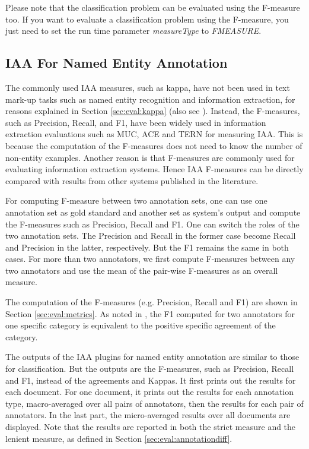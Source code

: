 Please note that the classification problem can be evaluated using the F-measure
too. If you want to evaluate a classification problem using the F-measure, you
just need to set the run time parameter {\em measureType} to {\em FMEASURE}.

\subsection{IAA For Named Entity Annotation}

The commonly used IAA measures, such as kappa, have not been used in text mark-up
tasks such as named entity recognition and information extraction, for reasons
explained in Section \ref{sec:eval:kappa} (also see \cite{Hripcsak05}). Instead,
the F-measures, such as Precision, Recall, and F1, have been widely used in
information extraction evaluations such as MUC, ACE and TERN for measuring IAA.
This is because the computation of the F-measures does not need to know the
number of non-entity examples. Another reason is that F-measures are commonly
used for evaluating information extraction systems. Hence IAA F-measures can be
directly compared with results from other systems published in the literature.

For computing F-measure between two annotation sets, one can use one annotation
set as gold standard and another set as system's output and compute the
F-measures such as Precision, Recall and F1. One can switch the roles of the two
annotation sets. The Precision and Recall in the former case become Recall and
Precision in the latter, respectively.  But the F1 remains the same in both
cases.  For more than two annotators, we first compute F-measures between any two
annotators and use the mean of the pair-wise F-measures as an overall measure.

The computation of the F-measures (e.g. Precision, Recall and F1) are
 shown in Section \ref{sec:eval:metrics}. As noted in \cite{Hripcsak05}, the F1
 computed for two annotators for one specific category is equivalent to the
 positive specific agreement of the category.

The outputs of the IAA plugins for named entity annotation are similar to those
for classification. But the outputs are the F-measures, such as Precision, Recall
and F1, instead of the agreements and Kappas. It first prints out the results for
each document. For one document, it prints out the results for each annotation
type, macro-averaged over all pairs of annotators, then the results for each pair
of annotators.  In the last part, the micro-averaged results over all documents
are displayed.  Note that the results are reported in both the strict measure and
the lenient measure, as defined in Section \ref{sec:eval:annotationdiff}.


